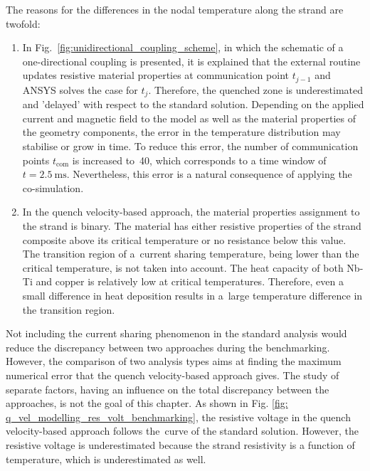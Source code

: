 The reasons for the differences in the nodal temperature along the strand are twofold:
\begin{enumerate}
    \item In Fig.~\ref{fig:unidirectional_coupling_scheme}, in which the schematic of a one-directional coupling is presented, it is explained that the external routine updates resistive material properties at communication point $t_{j-1}$ and ANSYS solves the case for $t_{j}$. Therefore, the quenched zone is underestimated and 'delayed' with respect to the standard solution. Depending on the applied current and magnetic field to the model as well as the material properties of the geometry components, the error in the temperature distribution may stabilise or grow in time. To reduce this error, the number of communication points $t_\text{com}$ is increased to~40, which corresponds to a time window of $t=2.5~\text{ms}$. Nevertheless, this error is a natural consequence of applying the co-simulation.
    \item In the quench velocity-based approach, the material properties assignment to the strand is binary. The material has either resistive properties of the strand composite above its critical temperature or no resistance below this value. The transition region of a~current sharing temperature, being lower than the critical temperature, is not taken into account. The heat capacity of both Nb-Ti and copper is relatively low at critical temperatures. Therefore, even a small difference in heat deposition results in a~large temperature difference in the transition region.
\end{enumerate}

Not including the current sharing phenomenon in the standard analysis would reduce the discrepancy between two approaches during the benchmarking. However, the comparison of two analysis types aims at finding the maximum numerical error that the quench velocity-based approach gives. The study of separate factors, having an influence on the total discrepancy between the approaches, is not the goal of this chapter. As shown in Fig. \ref{fig: q_vel_modelling_res_volt_benchmarking}, the resistive voltage in the quench velocity-based approach follows the~curve of the standard solution. However, the resistive voltage is underestimated because the strand resistivity is a function of temperature, which is underestimated as well. 

